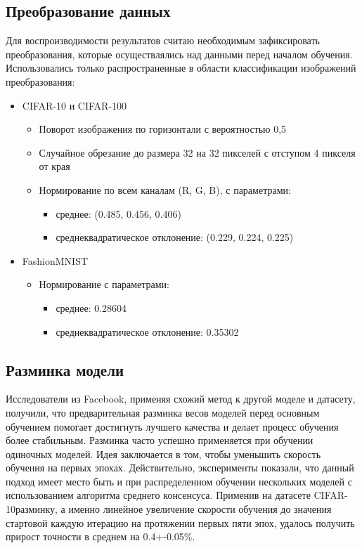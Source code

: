 \documentclass[a4paper,article,14pt]{extarticle}
\begin{document}
\subsection{Преобразование данных}
Для воспроизводимости результатов считаю необходимым зафиксировать преобразования, которые осуществлялись над данными перед началом обучения.
Использовались только распространенные в области классификации изображений преобразования:
\begin{itemize}
    \item CIFAR-10 и CIFAR-100
    \begin{itemize}
    \item Поворот изображения по горизонтали с вероятностью 0,5
    \item Случайное обрезание до размера 32 на 32 пикселей с отступом 4 пикселя от края
    \item Нормирование по всем каналам (R, G, B), с параметрами:
        \begin{itemize}
            \item среднее: (0.485, 0.456, 0.406)
            \item среднеквадратическое отклонение: (0.229, 0.224, 0.225)
        \end{itemize}
    \end{itemize}

    \item FashionMNIST
    \begin{itemize}
    \item Нормирование с параметрами:
        \begin{itemize}
            \item среднее: 0.28604
            \item среднеквадратическое отклонение: 0.35302
        \end{itemize}
    \end{itemize}

\end{itemize}

\subsection{Разминка модели}
Исследователи из Facebook, применяя \cite{012} схожий метод к другой моделе и датасету, получили, что предварительная разминка весов моделей перед основным обучением помогает достигнуть лучшего качества и делает процесс обучения более стабильным. Разминка часто успешно применяется при обучении одиночных моделей. Идея заключается в том, чтобы уменьшить скорость обучения на первых эпохах. Действительно, эксперименты показали, что данный подход имеет место быть и при распределенном обучении нескольких моделей с использованием алгоритма среднего консенсуса. Применив на датасете \flqq CIFAR-10\frqq{} разминку, а именно линейное увеличение скорости обучения до значения стартовой каждую итерацию на протяжении первых пяти эпох, удалось получить прирост точности в среднем на 0.4+-0.05\%.
\end{document}
